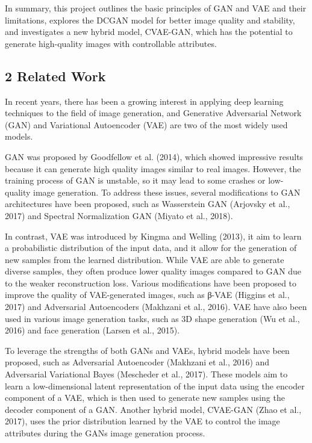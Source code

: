 \documentclass[
]{article}
\begin{document}
In summary, this project outlines the basic principles of GAN and VAE
and their limitations, explores the DCGAN model for better image quality
and stability, and investigates a new hybrid model, CVAE-GAN, which has
the potential to generate high-quality images with controllable
attributes.

\hypertarget{2-related-work}{%
\subsection{2 Related Work}\label{2-related-work}}

In recent years, there has been a growing interest in applying deep
learning techniques to the field of image generation, and Generative
Adversarial Network (GAN) and Variational Autoencoder (VAE) are two of
the most widely used models.

GAN was proposed by Goodfellow et al. (2014), which showed impressive
results because it can generate high quality images similar to real
images. However, the training process of GAN is unstable, so it may lead
to some crashes or low-quality image generation. To address these
issues, several modifications to GAN architectures have been proposed,
such as Wasserstein GAN (Arjovsky et al., 2017) and Spectral
Normalization GAN (Miyato et al., 2018).

In contrast, VAE was introduced by Kingma and Welling (2013), it aim to
learn a probabilistic distribution of the input data, and it allow for
the generation of new samples from the learned distribution. While VAE
are able to generate diverse samples, they often produce lower quality
images compared to GAN due to the weaker reconstruction loss. Various
modifications have been proposed to improve the quality of VAE-generated
images, such as β-VAE (Higgins et al., 2017) and Adversarial
Autoencoders (Makhzani et al., 2016). VAE have also been used in various
image generation tasks, such as 3D shape generation (Wu et al., 2016)
and face generation (Larsen et al., 2015).

To leverage the strengths of both GANs and VAEs, hybrid models have been
proposed, such as Adversarial Autoencoder (Makhzani et al., 2016) and
Adversarial Variational Bayes (Mescheder et al., 2017). These models aim
to learn a low-dimensional latent representation of the input data using
the encoder component of a VAE, which is then used to generate new
samples using the decoder component of a GAN. Another hybrid model,
CVAE-GAN (Zhao et al., 2017), uses the prior distribution learned by the
VAE to control the image attributes during the GAN\textquotesingle s
image generation process.
\end{document}
